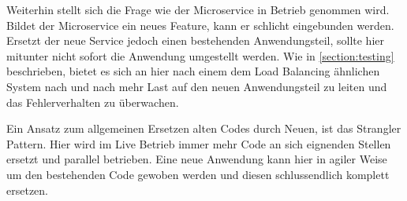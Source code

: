 Weiterhin stellt sich die Frage wie der Microservice in Betrieb genommen wird. Bildet der Microservice ein neues Feature, kann er schlicht eingebunden werden. Ersetzt der neue Service jedoch einen bestehenden Anwendungsteil, sollte hier mitunter nicht sofort die Anwendung umgestellt werden. Wie in \autoref{section:testing} beschrieben, bietet es sich an hier nach einem dem Load Balancing ähnlichen System nach und nach mehr Last auf den neuen Anwendungsteil zu leiten und das Fehlerverhalten zu überwachen.

Ein Ansatz zum allgemeinen Ersetzen alten Codes durch Neuen, ist das Strangler Pattern\cite[][]{Fowler:Strangler}. Hier wird im Live Betrieb immer mehr Code an sich eignenden Stellen ersetzt und parallel betrieben. Eine neue Anwendung kann hier in agiler Weise um den bestehenden Code gewoben werden und diesen schlussendlich komplett ersetzen.
